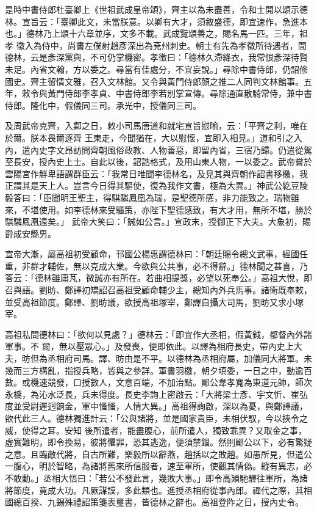 \begin{pinyinscope}
 是時中書侍郎杜臺卿上《世祖武成皇帝頌》，齊主以為未盡善，令和士開以頌示德林。宣旨云：「臺卿此文，未當朕意。以卿有大才，須敘盛德，即宜速作，急進本也。」德林乃上頌十六章並序，文多不載。武成覽頌善之，賜名馬一匹。三年，祖孝
 徵入為侍中，尚書左僕射趙彥深出為兗州刺史。朝士有先為孝徵所待遇者，間德林，云是彥深黨與，不可仍掌機密。孝徵曰：「德林久滯絳衣，我常恨彥深待賢未足。內省文翰，方以委之。尋當有佳處分，不宜妄說。」尋除中書侍郎，仍詔修國史。齊主留情文雅，召入文林館。又令與黃門侍郎顏之推二人同判文林館事。五年，敕令與黃門侍郎李孝貞、中書侍郎李若別掌宣傳。尋除通直散騎常侍，兼中書侍郎。隆化中，假儀同三司。承光中，授儀同三司。



 及周武帝克齊，入鄴之日，敕小司馬唐道和就宅宣旨慰喻，云：「平齊之利，唯在於爾。朕本畏爾逐齊
 王東走，今聞猶在，大以慰懷，宜即入相見。」道和引之入內，遣內史字文昂訪問齊朝風俗政教、人物善惡，即留內省，三宿乃歸。仍遣從駕至長安，授內史上士。自此以後，詔誥格式，及用山東人物，一以委之。武帝嘗於雲陽宮作鮮卑語謂群臣云：「我常日唯聞李德林名，及見其與齊朝作詔書移檄，我正謂其是天上人。豈言今日得其驅使，復為我作文書，極為大異。」神武公紇豆陵毅答曰：「臣聞明王聖主，得騏驎鳳凰為瑞，是聖德所感，非力能致之。瑞物雖來，不堪使用。如李德林來受驅策，亦陛下聖德感致，有大才用，無所不堪，勝於騏驎鳳凰遠矣。」
 武帝大笑曰：「誠如公言。」宣政末，授御正下大夫。大象初，賜爵成安縣男。



 宣帝大漸，屬高祖初受顧命，邗國公楊惠謂德林曰：「朝廷賜令總文武事，經國任重，非群才輔佐，無以克成大業。今欲與公共事，必不得辭。」德林聞之甚喜，乃答云：「德林雖庸芃，微誠亦有所在。若曲相提獎，必望以死奉公。」高祖大悅，即召與語。劉昉、鄭譯初矯詔召高祖受顧命輔少主，總知內外兵馬事。諸衛既奉敕，並受高祖節度。鄭譯、劉昉議，欲授高祖塚宰，鄭譯自攝大司馬，劉昉又求小塚宰。



 高祖私問德林曰：「欲何以見處？」德林云：「即宜作大丞相，假黃鉞，都督內外諸軍事。不
 爾，無以壓眾心。」及發喪，便即依此。以譯為相府長史，帶內史上大夫，昉但為丞相府司馬。譯、昉由是不平。以德林為丞相府屬，加儀同大將軍。未幾而三方構亂，指授兵略，皆與之參詳。軍書羽檄，朝夕填委，一日之中，動逾百數。或機速競發，口授數人，文意百端，不加治點。鄖公韋孝寬為東道元帥，師次永橋，為沁水泛長，兵未得度。長史李詢上密啟云：「大將梁士彥、宇文忻、崔弘度並受尉遲迥餉金，軍中慅慅，人情大異。」高祖得詢啟，深以為憂，與鄭譯議，欲代此三人。德林獨進計云：「公與諸將，並是國家貴臣，未相伏馭，今以挾令之威，使得之耳。安知
 後所遣者，能盡腹心，前所遣人，獨致乖異？又取金之事，虛實難明，即令換易，彼將懼罪，恐其逃逸，便須禁錮。然則鄖公以下，必有驚疑之意。且臨敵代將，自古所難，樂毅所以辭燕，趙括以之敗趙。如愚所見，但遣公一腹心，明於智略，為諸將舊來所信服者，速至軍所，使觀其情偽。縱有異志，必不敢動。」丞相大悟曰：「若公不發此言，幾敗大事。」即令高熲馳驛往軍所，為諸將節度，竟成大功。凡厥謀謨，多此類也。進授丞相府從事內郎。禪代之際，其相國總百揆、九錫殊禮詔策箋表璽書，皆德林之辭也。高祖登阼之日，授內史令。




\end{pinyinscope}
